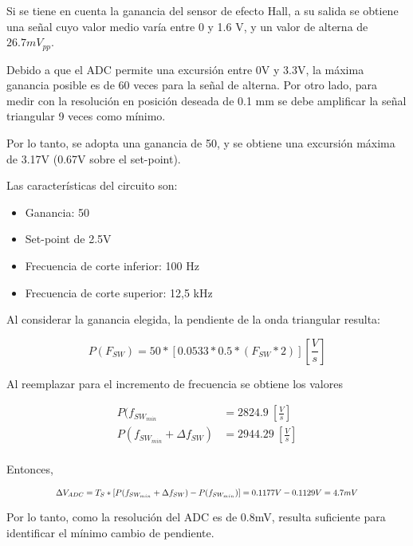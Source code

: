 \noindent Si se tiene en cuenta la ganancia del sensor de efecto Hall, a su salida se obtiene una señal cuyo valor medio varía entre 0 y 1.6 V, y un valor de alterna de $26.7 mV_{pp}$.

\noindent Debido a que el ADC permite una excursión entre 0V y 3.3V, la máxima ganancia posible es de 60 veces para la señal de alterna. Por otro lado, para medir con la resolución en posición deseada de 0.1 mm se debe amplificar la señal triangular 9 veces como mínimo.

\noindent Por lo tanto, se adopta una ganancia de 50, y se obtiene una excursión máxima de 3.17V (0.67V sobre el set-point).

\noindent Las características del circuito son:

\begin{itemize}
	\item Ganancia: 50
	\item Set-point de 2.5V 
	\item Frecuencia de corte inferior: 100 Hz
	\item Frecuencia de corte superior: 12,5 kHz
\end{itemize}

\noindent Al considerar la ganancia elegida,  la pendiente de la onda triangular resulta:

\begin{equation} 
	P(F_{SW}) = 50 * [0.0533 * 0.5 * (F_{SW}*2)][\frac{V}{s}]
\end{equation}

\noindent Al reemplazar para el incremento de frecuencia se obtiene los valores 

\begin{equation} 
	\begin{aligned}
		P(f_{SW_{min}} &= 2824.9 \ [\frac{V}{s}]\\
		P(f_{SW_{min}} + \Delta f_{SW}) &= 2944.29 \ [\frac{V}{s}]\\		 
	\end{aligned}
\end{equation}

\noindent Entonces, 


\begin{equation} 
	\resizebox{.8\hsize}{!}
	{
	$\Delta V_{ADC} = T_S * [P(f_{SW_{min}} + \Delta f_{SW}) - P(f_{SW_{min}})] = 0.1177 V - 0.1129 V = 4.7mV$
	}
\end{equation}


\noindent Por lo tanto, como la resolución del ADC es de 0.8mV, resulta suficiente para identificar el mínimo cambio de pendiente.



